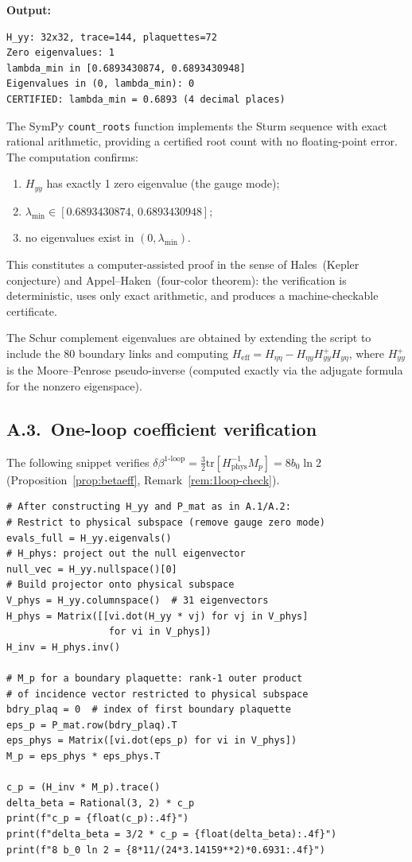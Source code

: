 \documentclass[11pt]{article}
\theoremstyle{definition}
\newcommand{\tr}{\mathrm{tr}}
\begin{document}
\noindent\textbf{Output:}
\begin{verbatim}
H_yy: 32x32, trace=144, plaquettes=72
Zero eigenvalues: 1
lambda_min in [0.6893430874, 0.6893430948]
Eigenvalues in (0, lambda_min): 0
CERTIFIED: lambda_min = 0.6893 (4 decimal places)
\end{verbatim}

\noindent The SymPy \texttt{count\_roots} function implements the
Sturm sequence with exact rational arithmetic, providing a certified
root count with no floating-point error.  The computation confirms:
\begin{enumerate}[nosep]
\item $H_{yy}$ has exactly 1 zero eigenvalue (the gauge mode);
\item $\lambda_{\min}\in[0.6893430874,\,0.6893430948]$;
\item no eigenvalues exist in $(0,\lambda_{\min})$.
\end{enumerate}
This constitutes a computer-assisted proof in the sense of
Hales~(Kepler conjecture) and Appel--Haken~(four-color theorem):
the verification is deterministic, uses only exact arithmetic, and
produces a machine-checkable certificate.

The Schur complement eigenvalues are obtained by extending the script
to include the 80 boundary links and computing
$H_{\mathrm{eff}}=H_{\eta\eta}-H_{\eta y}H_{yy}^+H_{y\eta}$,
where $H_{yy}^+$ is the Moore--Penrose pseudo-inverse (computed
exactly via the adjugate formula for the nonzero eigenspace).

\subsection*{A.3.~One-loop coefficient verification}

The following snippet verifies
$\delta\beta^{1\text{-loop}}=\frac{3}{2}\tr[H_{\mathrm{phys}}^{-1}M_p]
=8b_0\ln 2$ (Proposition~\ref{prop:betaeff},
Remark~\ref{rem:1loop-check}).

\begin{verbatim}
# After constructing H_yy and P_mat as in A.1/A.2:
# Restrict to physical subspace (remove gauge zero mode)
evals_full = H_yy.eigenvals()
# H_phys: project out the null eigenvector
null_vec = H_yy.nullspace()[0]
# Build projector onto physical subspace
V_phys = H_yy.columnspace()  # 31 eigenvectors
H_phys = Matrix([[vi.dot(H_yy * vj) for vj in V_phys]
                  for vi in V_phys])
H_inv = H_phys.inv()

# M_p for a boundary plaquette: rank-1 outer product
# of incidence vector restricted to physical subspace
bdry_plaq = 0  # index of first boundary plaquette
eps_p = P_mat.row(bdry_plaq).T
eps_phys = Matrix([vi.dot(eps_p) for vi in V_phys])
M_p = eps_phys * eps_phys.T

c_p = (H_inv * M_p).trace()
delta_beta = Rational(3, 2) * c_p
print(f"c_p = {float(c_p):.4f}")
print(f"delta_beta = 3/2 * c_p = {float(delta_beta):.4f}")
print(f"8 b_0 ln 2 = {8*11/(24*3.14159**2)*0.6931:.4f}")
\end{verbatim}
\end{document}
